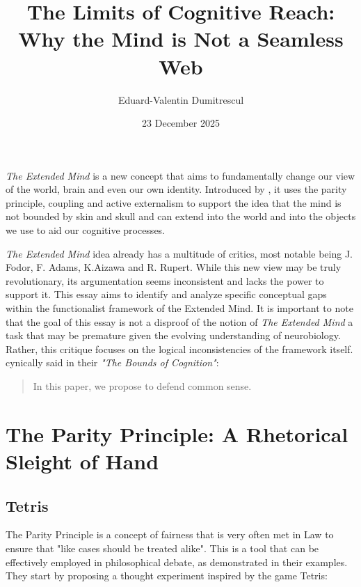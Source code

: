 \documentclass[12pt]{article}
\begin{document}
\title{The Limits of Cognitive Reach: Why the Mind is Not a Seamless Web}
\author{Eduard-Valentin Dumitrescul}
\date{23 December 2025}

\maketitle

\textit{The Extended Mind} \parencite{clark1998extended} is a new concept that aims to fundamentally
change our view of the world, brain and even our own identity. Introduced by \textcite{clark1998extended}, it uses the parity principle, coupling and active externalism to support the idea that
the mind is not bounded by skin and skull and can extend into the world and into the 
objects we use to aid our cognitive processes. 


\textit{The Extended Mind} idea already has a multitude of critics, most notable being J. Fodor, 
F. Adams, K.Aizawa and R. Rupert. While this new view may be truly revolutionary,
its argumentation seems inconsistent and lacks the power to support it.
This essay aims to identify and analyze specific conceptual gaps within the functionalist
framework of the Extended Mind.
It is important to note that the goal of this essay is not a disproof of the notion of
\textit{The Extended Mind} \textemdash a task that may be premature given the evolving
understanding of neurobiology. Rather, this critique focuses on the logical inconsistencies
of the framework itself.
\textcite{adams2001bounds} cynically said in their 
\textit{"The Bounds of Cognition"}:
\begin{quote}
    In this paper, we propose to defend common sense. \parencite[p. 46]{adams2001bounds}
\end{quote}


\section{The Parity Principle: A Rhetorical Sleight of Hand}

\subsection{Tetris}

The Parity Principle is a concept of fairness that is very often met in Law to ensure 
that "like cases should be treated alike". This is a tool that can be effectively employed
in philosophical debate, as \textcite{clark1998extended} demonstrated in their examples.
They start by proposing a thought experiment inspired by the game Tetris:
\end{document}
